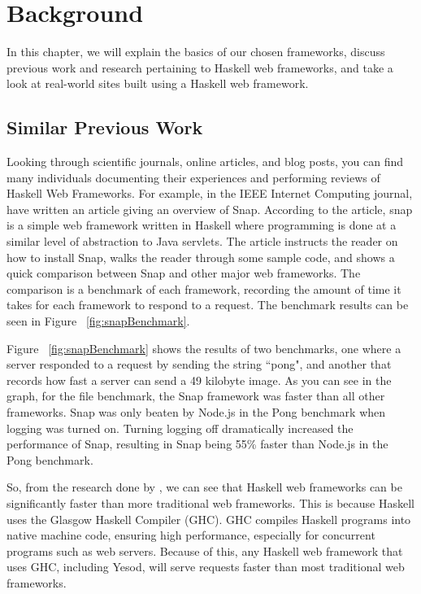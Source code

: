 \chapter{Background}
\label{chap:Background}

In this chapter, we will explain the basics of our chosen frameworks,
discuss previous work and research pertaining
to Haskell web frameworks, and take a look at real-world sites built 
using a Haskell web framework.

\section{Similar Previous Work}

Looking through scientific journals, online articles, and blog posts,
you can find many individuals documenting their experiences and performing
reviews of Haskell Web Frameworks. For example, in the IEEE Internet Computing
journal, \citeauthor{snapFramework} have written an article giving an overview
of Snap. According to the article, snap is a simple web framework written
in Haskell where programming is done at a similar level of abstraction
to Java servlets. The article instructs the reader on how to install Snap, 
walks the reader through some sample code, and shows a quick comparison
between Snap and other major web frameworks. The comparison is a benchmark
of each framework, recording the amount of time it takes for each framework
to respond to a request. The benchmark results can be seen in Figure 
~\ref{fig:snapBenchmark}. \parencite{snapFramework}

Figure ~\ref{fig:snapBenchmark} shows the results of two benchmarks, one where a server
responded to a request by sending the string ``pong", and another that records how fast
a server can send a 49 kilobyte image. As you can see in the
graph, for the file benchmark, the Snap framework was faster than all other frameworks.
Snap was only beaten by Node.js in the Pong benchmark when logging was turned on.
Turning logging off dramatically increased the performance of Snap, resulting in
Snap being 55\% faster than Node.js in the Pong benchmark. \parencite{snapFramework}

So, from the research done by \citeauthor{snapFramework}, we can see that Haskell
web frameworks can be significantly faster than more traditional web frameworks.
This is because Haskell uses the Glasgow Haskell Compiler (GHC). GHC compiles
Haskell programs into native machine code, ensuring high performance, especially
for concurrent programs such as web servers. Because of this, any Haskell web framework
that uses GHC, including Yesod, will serve requests faster than most traditional
web frameworks. \parencite{ghcSite}

